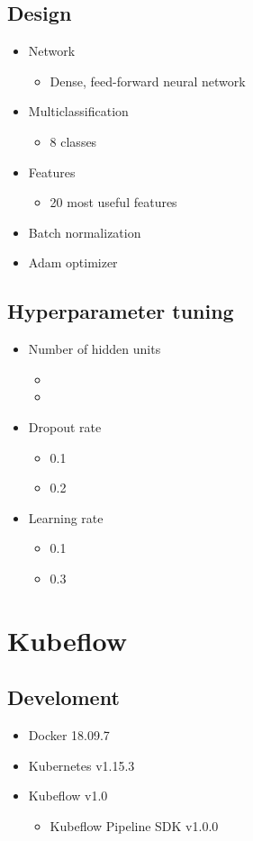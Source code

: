 \documentclass[11pt]{article}
\begin{document}
\subsection*{Design}
\label{sec:org984df0c}
\begin{itemize}
\item Network
\begin{itemize}
\item Dense, feed-forward neural network
\end{itemize}
\item Multiclassification
\begin{itemize}
\item 8 classes
\end{itemize}
\item Features
\begin{itemize}
\item 20 most useful features
\end{itemize}
\item Batch normalization
\item Adam optimizer
\end{itemize}
\subsection*{Hyperparameter tuning}
\label{sec:org15d9683}
\begin{itemize}
\item Number of hidden units
\begin{itemize}
\item\relax [60, 30, 20]
\item\relax [60, 40, 30, 20]
\end{itemize}
\item Dropout rate
\begin{itemize}
\item 0.1
\item 0.2
\end{itemize}
\item Learning rate
\begin{itemize}
\item 0.1
\item 0.3
\end{itemize}
\end{itemize}
\section*{Kubeflow}
\label{sec:orgb42a5cb}
\subsection*{Develoment}
\label{sec:orgf17189a}
\begin{itemize}
\item Docker 18.09.7
\item Kubernetes v1.15.3
\item Kubeflow v1.0
\begin{itemize}
\item Kubeflow Pipeline SDK v1.0.0
\end{itemize}
\end{itemize}
\end{document}
